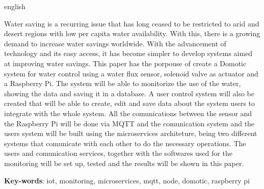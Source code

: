 \documentclass[
	12pt,				%
	oneside,
	a4paper,			%
	english,			%
	brazil				%
	]{abntex2ufop} %
\begin{document}
\begin{resumo}[Abstract]
  \begin{otherlanguage*}{english}

 \noindent Water saving is a recurring issue that has long ceased to be restricted to arid and desert regions with low per capita water availability. With this, there is a growing demand to increase water savings worldwide. With the advancement of technology and its easy access, it has become simpler to develop systems aimed at improving water savings. This paper has the porpouse of create a Domotic system for water control using a water flux sensor, solenoid valve as actuator and a Raspberry Pi. The system will be able to monitorize the use of the water, showing the data and saving it in a database. A user control system will also be created that will be able to create, edit and save data about the system users to integrate with the whole system. All the comunications between the sensor and the Raspberry Pi will be done via MQTT and the comunication system and the users system will be built using the microservices architeture, being two different systems that comunicate with each other to do the necessary operations. The users and comunication services, together with the softwares used for the monitoring will be set up, tested and the results will be shown in this paper.

   \vspace{\onelineskip}
 
   \noindent 
   \textbf{Key-words}: iot, monitoring, microservices, mqtt, node, domotic, raspberry pi
  \end{otherlanguage*}
\end{resumo}

% 
%
%  
\end{document}
